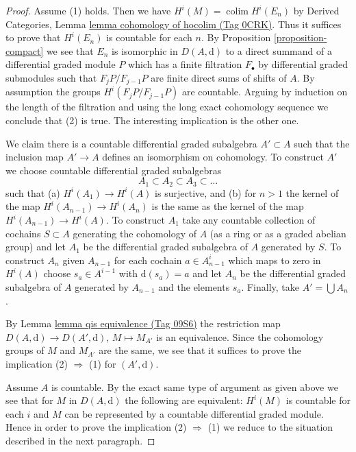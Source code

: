 \documentclass{amsart}
\theoremstyle{plain}
\theoremstyle{definition}
\theoremstyle{remark}
\numberwithin{equation}{subsection}
\def\colim{\mathop{\mathrm{colim}}\nolimits}
\begin{document}
\begin{proof}
Assume (1) holds. Then we have $H^i(M) = \colim H^i(E_n)$ by
Derived Categories, Lemma \href{https://stacks.math.columbia.edu/tag/0CRK}{lemma cohomology of hocolim (Tag 0CRK)}.
Thus it suffices to prove that $H^i(E_n)$ is countable for each $n$.
By Proposition \ref{proposition-compact} we see that $E_n$
is isomorphic in $D(A, \text{d})$ to a direct summand of a
differential graded module $P$ which has a finite filtration
$F_\bullet$ by differential graded submodules
such that $F_jP/F_{j - 1}P$ are finite direct sums of shifts of $A$.
By assumption the groups $H^i(F_jP/F_{j - 1}P)$ are countable.
Arguing by induction on the length of the filtration and using
the long exact cohomology sequence we conclude that (2) is true.
The interesting implication is the other one.

\medskip\noindent
We claim there is a countable differential graded
subalgebra $A' \subset A$ such that the inclusion map
$A' \to A$ defines an isomorphism on cohomology.
To construct $A'$ we choose countable differential graded
subalgebras
$$
A_1 \subset A_2 \subset A_3 \subset \ldots
$$
such that (a) $H^i(A_1) \to H^i(A)$ is surjective, and (b)
for $n > 1$ the kernel of the map $H^i(A_{n - 1}) \to H^i(A_n)$
is the same as the kernel of the map $H^i(A_{n - 1}) \to H^i(A)$.
To construct $A_1$ take any countable collection of cochains
$S \subset A$ generating the cohomology of $A$ (as a ring or as
a graded abelian group) and let
$A_1$ be the differential graded subalgebra of $A$ generated by $S$.
To construct $A_n$ given $A_{n - 1}$ for each cochain $a \in A_{n - 1}^i$
which maps to zero in $H^i(A)$ choose $s_a \in A^{i - 1}$
with $\text{d}(s_a) = a$ and let $A_n$ be the differential graded
subalgebra of $A$ generated by $A_{n - 1}$ and the elements $s_a$.
Finally, take $A' = \bigcup A_n$.

\medskip\noindent
By Lemma \href{https://stacks.math.columbia.edu/tag/09S6}{lemma qis equivalence (Tag 09S6)}
the restriction map $D(A, \text{d}) \to D(A', \text{d})$,
$M \mapsto M_{A'}$ is an equivalence. Since the cohomology
groups of $M$ and $M_{A'}$ are the same, we see that it
suffices to prove the implication (2) $\Rightarrow$ (1)
for $(A', \text{d})$.

\medskip\noindent
Assume $A$ is countable. By the exact same type of argument as
given above we see that for $M$ in $D(A, \text{d})$
the following are equivalent: $H^i(M)$ is countable for each $i$
and $M$ can be represented by a countable differential graded module.
Hence in order to prove the implication (2) $\Rightarrow$ (1)
we reduce to the situation described in the next paragraph.


\end{proof}
\end{document}
